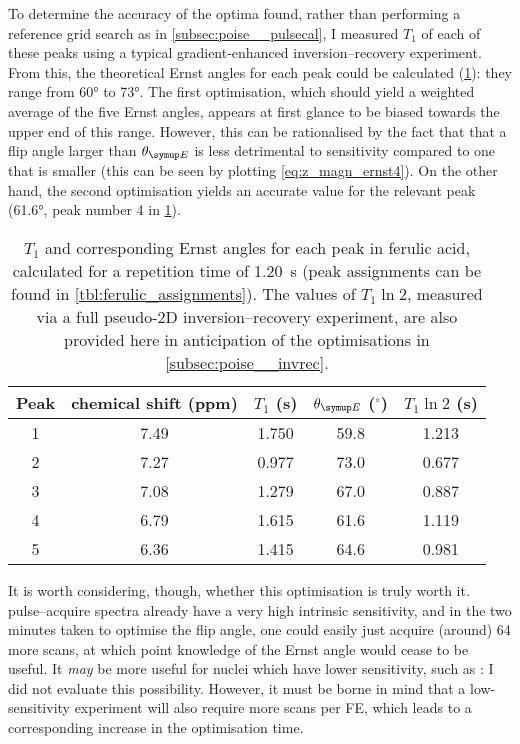 To determine the accuracy of the optima found, rather than performing a reference grid search as in \cref{subsec:poise__pulsecal}, I measured $T_1$ of each of these peaks using a typical gradient-enhanced inversion--recovery experiment.
From this, the theoretical Ernst angles for each peak could be calculated (\cref{tbl:ernst_invrec}): they range from \ang{60} to \ang{73}.
The first optimisation, which should yield a weighted average of the five Ernst angles, appears at first glance to be biased towards the upper end of this range.
However, this can be rationalised by the fact that that a flip angle larger than $\thetaE$ is less detrimental to sensitivity compared to one that is smaller (this can be seen by plotting \cref{eq:z_magn_ernst4}).
On the other hand, the second optimisation yields an accurate value for the relevant peak (\ang{61.6}, peak number 4 in \cref{tbl:ernst_invrec}).

\begin{table}[!ht]
    \centering
    \begin{tabular}{ccccc}
        \toprule
        Peak & \proton{} chemical shift (ppm) & $T_1$ (\unit{\s}) & $\thetaE$ ($^\circ$) & $T_1\ln 2$ (\unit{\s})\\
        \midrule
        1 & 7.49 & 1.750 & 59.8 & 1.213 \\
        2 & 7.27 & 0.977 & 73.0 & 0.677 \\
        3 & 7.08 & 1.279 & 67.0 & 0.887 \\
        4 & 6.79 & 1.615 & 61.6 & 1.119 \\
        5 & 6.36 & 1.415 & 64.6 & 0.981 \\
        \bottomrule
    \end{tabular}
    \caption[$T_1$ values for ferulic acid]{
        $T_1$ and corresponding Ernst angles for each peak in ferulic acid, calculated for a repetition time of \qty{1.20}{\s} (peak assignments can be found in \cref{tbl:ferulic_assignments}).
        The values of $T_1 \ln 2$, measured via a full pseudo-2D inversion--recovery experiment, are also provided here in anticipation of the optimisations in \cref{subsec:poise__invrec}.
    }
    \label{tbl:ernst_invrec}
\end{table}

It is worth considering, though, whether this optimisation is truly worth it.
\proton{} pulse--acquire spectra already have a very high intrinsic sensitivity, and in the two minutes taken to optimise the flip angle, one could easily just acquire (around) 64 more scans, at which point knowledge of the Ernst angle would cease to be useful.
It \textit{may} be more useful for nuclei which have lower sensitivity, such as \carbon{}: I did not evaluate this possibility.
However, it must be borne in mind that a low-sensitivity experiment will also require more scans per FE, which leads to a corresponding increase in the optimisation time.

